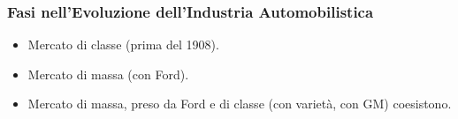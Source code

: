 \documentclass[a4paper,portrait,12pt]{article}
\theoremstyle{definition}
\begin{document}

\subsubsection{Fasi nell'Evoluzione dell'Industria Automobilistica}

\begin{itemize}
\item Mercato di classe (prima del 1908).
\item Mercato di massa (con Ford).
\item Mercato di massa, preso da Ford e di classe (con varietà, con GM) coesistono.
\end{itemize}






\end{document}
